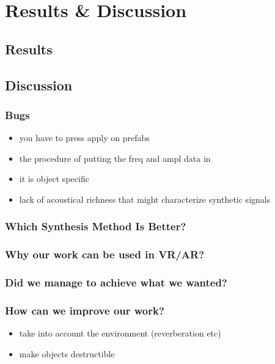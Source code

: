 \chapter{Results \& Discussion}\label{ch:results}

\section{Results}

\section{Discussion}
\subsection{Bugs}
\begin{itemize}
\item you have to press apply on prefabs
\item the procedure of putting the freq and ampl data in
\item it is object specific
\item lack of acoustical richness that might characterize synthetic signals \cite{giordano2006material}
\end{itemize}
\subsection{Which Synthesis Method Is Better?}

\subsection{Why our work can be used in VR/AR?}

\subsection{Did we manage to achieve what we wanted?}

\subsection{How can we improve our work?}
\begin{itemize}
\item take into account the environment (reverberation etc)
\item make objects destructible
\end{itemize}
